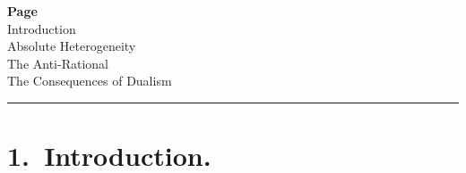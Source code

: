 \documentclass[12pt,a4paper]{book}
\newcommand{\opage}[1]{\marginnote{\footnotesize\textit{[#1]}}}
\begin{document}
\begin{flushleft}
\hfill\textbf{Page}\\[2pt]
Introduction \\
Absolute Heterogeneity \\
The Anti-Rational \\
The Consequences of Dualism 
\end{flushleft}

\begin{center}
\rule{1.5cm}{0.4pt}
\end{center}

\opage{6}

\chapter*{1.\ Introduction.}
\label{ch:1}
\end{document}
